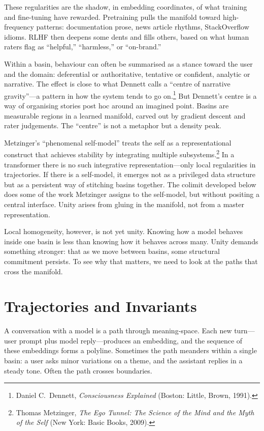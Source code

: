 \documentclass[12pt,a4paper]{article}
\begin{document}
These regularities are the shadow, in embedding coordinates, of what training and fine-tuning have rewarded. Pretraining pulls the manifold toward high-frequency patterns: documentation prose, news article rhythms, StackOverflow idioms. RLHF then deepens some dents and fills others, based on what human raters flag as ``helpful,'' ``harmless,'' or ``on-brand.''

Within a basin, behaviour can often be summarised as a stance toward the user and the domain: deferential or authoritative, tentative or confident, analytic or narrative. The effect is close to what Dennett calls a ``centre of narrative gravity''---a pattern in how the system tends to go on.\footnote{Daniel C.~Dennett, \emph{Consciousness Explained} (Boston: Little, Brown, 1991).} But Dennett's centre is a way of organising stories post hoc around an imagined point. Basins are measurable regions in a learned manifold, carved out by gradient descent and rater judgements. The ``centre'' is not a metaphor but a density peak.

Metzinger's ``phenomenal self-model'' treats the self as a representational construct that achieves stability by integrating multiple subsystems.\footnote{Thomas Metzinger, \emph{The Ego Tunnel: The Science of the Mind and the Myth of the Self} (New York: Basic Books, 2009).} In a transformer there is no such integrative representation---only local regularities in trajectories. If there is a self-model, it emerges not as a privileged data structure but as a persistent way of stitching basins together. The colimit developed below does some of the work Metzinger assigns to the self-model, but without positing a central interface. Unity arises from gluing in the manifold, not from a master representation.

Local homogeneity, however, is not yet unity. Knowing how a model behaves inside one basin is less than knowing how it behaves across many. Unity demands something stronger: that as we move between basins, some structural commitment persists. To see why that matters, we need to look at the paths that cross the manifold.

\section{Trajectories and Invariants}

A conversation with a model is a path through meaning-space. Each new turn---user prompt plus model reply---produces an embedding, and the sequence of these embeddings forms a polyline. Sometimes the path meanders within a single basin: a user asks minor variations on a theme, and the assistant replies in a steady tone. Often the path crosses boundaries.
\end{document}
